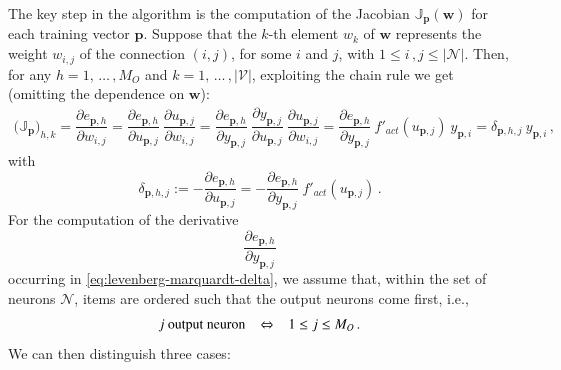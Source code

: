 \documentclass{elsarticle}
\numberwithin{equation}{section}
\theoremstyle{theorem}
\theoremstyle{definition}
\theoremstyle{remark}
\theoremstyle{proposition}
\numberwithin{figure}{section}
\begin{document}
		The key step in the algorithm is the computation of the Jacobian $\mathbb{J}_{\mathbf{p}}(\mathbf{w})$ for each training vector $\mathbf{p}$. Suppose that the $k$-th element $w_k$ of $\mathbf{w}$ represents the weight $w_{i,j}$ of the connection $(i,j)$, for some $i$ and $j$, with $1 \leq i \, , j \leq |\mathcal{N}|$. Then, for any $h = 1, \, \ldots \, , M_O$ and $k = 1, \, \ldots \, , |\mathcal{V}|$, exploiting the chain rule we get (omitting the dependence on $\mathbf{w}$):
		\begin{equation*}
			\label{eq:jacobian-entry-equation}
			\begin{aligned}
				\big( \mathbb{J}_{\mathbf{p}} \big)_{h,k} = \dfrac{\partial e_{\mathbf{p},h}}{\partial w_{i,j}} = \dfrac{\partial e_{\mathbf{p},h}}{\partial u_{\mathbf{p},j}} ~ \dfrac{\partial u_{\mathbf{p},j}}{\partial w_{i,j}} 
				= \dfrac{\partial e_{\mathbf{p},h}}{\partial y_{\mathbf{p},j}} ~ \dfrac{\partial y_{\mathbf{p},j}}{\partial u_{\mathbf{p},j}} ~ \dfrac{\partial u_{\mathbf{p},j}}{\partial w_{i,j}} 
				= \dfrac{\partial e_{\mathbf{p},h}}{\partial y_{\mathbf{p},j}} ~ f'_{act}(u_{\mathbf{p},j}) ~ y_{\mathbf{p},i}
				= \delta_{\mathbf{p},h,j} ~ y_{\mathbf{p},i} \, ,
			\end{aligned}
		\end{equation*} 
		with
		\begin{equation}
			\label{eq:levenberg-marquardt-delta}
			\delta_{\mathbf{p},h,j} := - \dfrac{\partial e_{\mathbf{p},h}}{\partial u_{\mathbf{p},j}} = - \dfrac{\partial e_{\mathbf{p},h}}{\partial y_{\mathbf{p},j}} ~ f'_{act}(u_{\mathbf{p},j}) \, .
		\end{equation}
		For the computation of the derivative 
		\begin{equation*}
			\dfrac{\partial e_{\mathbf{p},h}}{\partial y_{\mathbf{p},j}}
		\end{equation*}
		occurring in \eqref{eq:levenberg-marquardt-delta}, we assume that, within the set of neurons $\mathcal{N}$, items are ordered such that the output neurons come first, i.e.,
		\begin{equation*}
			\text{$j$ output neuron \hspace*{0.2cm} $\Leftrightarrow$ \hspace*{0.2cm} $1 \leq j \leq M_O$} \, .
		\end{equation*} 
		We can then distinguish three cases:
\end{document}
